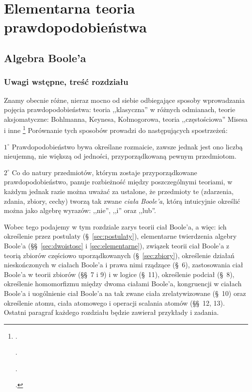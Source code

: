\documentclass[12 pt, a4paper, leqno]{book}
\numberwithin{equation}{section}
\theoremstyle{twr}
\theoremstyle{twr}
\theoremstyle{eqtext}
\theoremstyle{okreslenie}
\def\mycommand{\setlength{\abovedisplayskip}{7pt}%
\setlength{\belowdisplayskip}{7pt}%
\setlength{\abovedisplayshortskip}{7pt}%
\setlength{\belowdisplayshortskip}{7pt}}
\let\oldselectfont\selectfont
\def\selectfont{\oldselectfont\mycommand}
\begin{document}
\part{Elementarna teoria prawdopodobieństwa}
\chapter{Algebra Boole'a}

\section{Uwagi wstępne, treść rozdziału} \label{sec:wstep}
Znamy obecnie różne, nieraz mocno od siebie odbiegające sposoby wprowadzania pojęcia 
prawdopodobieństwa: teoria ,,klasyczna'' w różnych odmianach, teorie aksjomatyczne:
 {\selectfont Bohlmanna, Keynesa, Kołmogorowa}, teoria ,,częstościowa''
{\selectfont Misesa} i inne \footnote{\cite{bohlmann1}. \par \hspace{20pt} \cite{keynes1}. \par \hspace{20pt} \cite{kolmogoroff1}. \par \hspace{20pt} \cite{mises1}.}
Porównanie tych sposobów prowadzi do następujących spostrzeżeń:

$1^\circ$ Prawdopodobieństwo bywa określane rozmaicie, zawsze jednak jest ono liczbą nieujemną,
            nie większą od jedności, przyporządkowaną pewnym przedmiotom.

$2^\circ$ Co do natury przedmiotów, którym zostaje przyporządkowane prawdopodobieństwo, panuje rozbieżność
            między poszczególnymi teoriami, w każdym jednak razie można uważać za ustalone, że przedmioty 
            te (zdarzenia, zdania, zbiory, cechy) tworzą tak zwane \textit{ciała Boole'a}, którą
            intuicyjnie określić można jako algebrę wyrazów: ,,nie'', ,,i'' oraz ,,lub''.

Wobec tego podajemy w tym rozdziale zarys teorii ciał Boole'a, a więc: ich określenie
przez postulaty (\S\ \ref{sec:postulaty}), elementarne twierdzenia algebry Boole'a (\S\S\ \ref{sec:dwoistosc} i \ref{sec:elementarne}), związek teorii ciał Boole'a
z teorią zbiorów częściowo uporządkowanych (\S\ \ref{sec:zbiory}), określenie działań nieskończonych w ciałach Boole'a i prawa nimi rządzące (\S\ 6),
zastosowania ciał Boole'a w teorii zbiorów (\S\S\ 7 i 9) i w logice (\S\ 11), określenie podciał (\S\ 8), 
określenie homomorfizmu między dwoma ciałami Boole'a, kongruencji w ciałach Boole'a i uogólnienie ciał Boole'a na tak zwane
ciała zrelatywizowane (\S\ 10) oraz określenie atomu, ciała atomowego i operacji scalania
atomów (\S\S\ 12, 13). Ostatni paragraf każdego rozdziału będzie zawierał przykłady i zadania.
\end{document}
